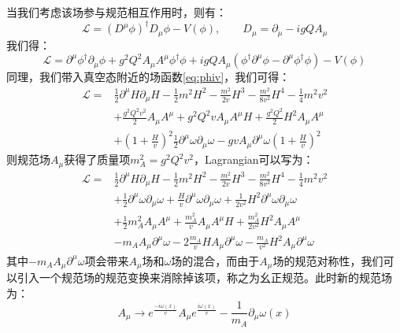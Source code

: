 当我们考虑该场参与规范相互作用时，则有：
\begin{equation}
    \mathscr{L}=(D^\mu\phi)^\dagger D_\mu\phi-V(\phi),\qquad D_\mu = \partial_\mu -igQ A_\mu%
\end{equation}
我们得：
\begin{equation}
    \mathscr{L}=\partial^\mu\phi^\dagger\partial_\mu\phi+g^2Q^2A_\mu A^\mu \phi^\dagger\phi + igQA_\mu(\phi^\dagger\partial^\mu \phi - \partial^\mu\phi^\dagger \phi)-V(\phi)
\end{equation}
同理，我们带入真空态附近的场函数\eqref{eq:phiv}，我们可得：
\begin{equation}
\begin{split}
    \mathscr{L}=&\frac{1}{2}\partial^\mu H\partial_\mu H-\frac{1}{2}m^2 H^2  -\frac{m^2}{2v} H^3-\frac{m^2}{8v^2} H^4-\frac{1}{4}m^2 v^2\\
    &+  \frac{g^2Q^2v^2}{2}A_\mu A^\mu + g^2Q^2 v A_\mu A^\mu  H + \frac{g^2Q^2}{2}  H^2 A_\mu A^\mu\\
    &+ \left(1+\frac{H}{v}\right)^2\frac{1}{2}\partial^\mu\omega \partial_\mu\omega  -g v A_\mu \partial^\mu\omega \left(1+\frac{H}{v}\right)^2
\end{split}
\end{equation}
则规范场$A_\mu$获得了质量项$m_A^2=g^2 Q^2 v^2$，Lagrangian可以写为：
\begin{equation}
\begin{split}
    \mathscr{L}=&\frac{1}{2}\partial^\mu H\partial_\mu H-\frac{1}{2}m^2 H^2  -\frac{m^2}{2v} H^3-\frac{m^2}{8v^2} H^4-\frac{1}{4}m^2 v^2\\
    &+ \frac{1}{2}\partial^\mu\omega \partial_\mu\omega  +\frac{H}{v} \partial^\mu\omega \partial_\mu\omega  + \frac{1}{2v^2}H^2\partial^\mu\omega \partial_\mu\omega \\
    &+ \frac{1}{2}m_A^2 A_\mu A^\mu + \frac{m_A^2}{v} A_\mu A^\mu  H +\frac{m_A^2}{2v^2} H^2 A_\mu A^\mu\\
    &-m_A A_\mu \partial^\mu\omega - 2\frac{m_A}{v} H A_\mu\partial^\mu\omega - \frac{m_A}{v^2} H^2 A_\mu\partial^\mu\omega
\end{split}
\end{equation}
其中$-m_A A_\mu \partial^\mu\omega$项会带来$A_\mu$场和$\omega$场的混合，而由于$A_\mu$场的规范对称性，我们可以引入一个规范场的规范变换来消除掉该项，称之为幺正规范。此时新的规范场为：
\begin{equation}
    A_\mu \rightarrow e^{\frac{-i\omega(x)}{v}}A_\mu e^{\frac{i\omega(x)}{v}} - \frac{1}{m_A}\partial_\mu \omega(x)
\end{equation}
